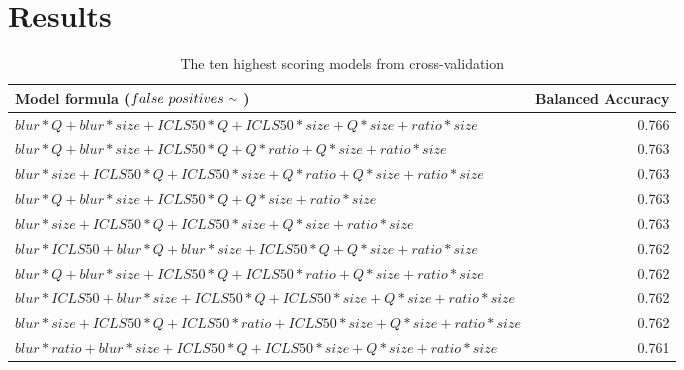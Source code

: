 \documentclass[12pt]{article}
\newcommand{\mytilde}{\raise.17ex\hbox{$\scriptstyle\mathtt{\sim}$}} %
\begin{document}
\section{Results}

\begin{table}[ht]
	\caption{The ten highest scoring models from cross-validation}
	\tiny
	\begin{center}
	\begin{tabular}{lr}
		\toprule
		Model formula ($false \ positives \ \mytilde \ $) & Balanced Accuracy \\ 
		\midrule
		$blur*Q+blur*size+ICLS50*Q+ICLS50*size+Q*size+ratio*size$ & 0.766 \\
		$blur*Q+blur*size+ICLS50*Q+Q*ratio+Q*size+ratio*size$ & 0.763 \\
		$blur*size+ICLS50*Q+ICLS50*size+Q*ratio+Q*size+ratio*size$ & 0.763 \\
		$blur*Q+blur*size+ICLS50*Q+Q*size+ratio*size$ & 0.763 \\
		$blur*size+ICLS50*Q+ICLS50*size+Q*size+ratio*size$ & 0.763 \\
		$blur*ICLS50+blur*Q+blur*size+ICLS50*Q+Q*size+ratio*size$ & 0.762 \\
		$blur*Q+blur*size+ICLS50*Q+ICLS50*ratio+Q*size+ratio*size$ & 0.762 \\
		$blur*ICLS50+blur*size+ICLS50*Q+ICLS50*size+Q*size+ratio*size$ & 0.762 \\
		$blur*size+ICLS50*Q+ICLS50*ratio+ICLS50*size+Q*size+ratio*size$ & 0.762 \\
		$blur*ratio+blur*size+ICLS50*Q+ICLS50*size+Q*size+ratio*size$ & 0.761 \\  
		\bottomrule
	\end{tabular}
	\end{center}
	\label{tab:CVtop10}
\end{table}
\end{document}

